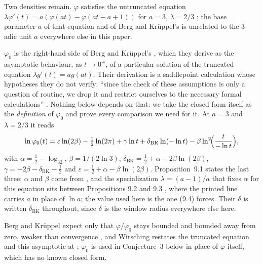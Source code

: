 \documentclass[11pt]{article}
\theoremstyle{definition}
\theoremstyle{remark}
\begin{document}
Two densities remain. $\varphi$ satisfies the
untruncated equation $\lambda\varphi'(t)=a(\varphi(at)-\varphi(at-a+1))$
for $a=3$, $\lambda=2/3$ \cite[eq.~(7.9)]{Wirsching2003}; the base
parameter $a$ of that equation and of Berg and Kr\"uppel's is unrelated
to the $3$-adic unit $a$ everywhere else in this paper.

$\varphi_0$ is the right-hand side of Berg and Kr\"uppel's
\cite[Proposition~9.1, eq.~(9.6)]{BergKruppel1998}, which they derive as
the asymptotic behaviour, as $t\to0^+$, of a particular solution of the
truncated equation $\lambda g'(t)=ag(at)$. Their derivation is a
saddlepoint calculation whose hypotheses they do not verify: ``since the
check of these assumptions is only a question of routine, we drop it and
restrict ourselves to the necessary formal calculations''
\cite[\S9]{BergKruppel1998}. Nothing below depends on that: we take the
closed form itself as the \emph{definition} of $\varphi_0$ and prove
every comparison we need for it. At $a=3$ and $\lambda=2/3$ it reads
\begin{equation}\label{eq:phi0}
 \ln\varphi_0(t)=
 \varepsilon\ln(2\beta)-\tfrac12\ln(2\pi)
 +\gamma\ln t+\delta_{\mathrm{BK}}\ln(-\ln t)
 -\beta\ln^2\!\Bigl(\frac{t}{-\ln t}\Bigr),
\end{equation}
with
$\alpha=\tfrac12-\log_32$,
$\beta=1/(2\ln3)$,
$\delta_{\mathrm{BK}}=\tfrac12+\alpha-2\beta\ln(2\beta)$,
$\gamma=-2\beta-\delta_{\mathrm{BK}}-\tfrac12$ and
$\varepsilon=\tfrac12+\alpha-\beta\ln(2\beta)$. Proposition~9.1 states
the last three; $\alpha$ and $\beta$ come from
\cite[eq.~(9.4)]{BergKruppel1998}, and the specialization
$\lambda=(a-1)/a$ that fixes $\alpha$ for this equation sits between
Propositions 9.2 and 9.3 \cite[p.~180]{BergKruppel1998}, where the
printed line carries $a$ in place of $\ln a$; the value used here is the
one (9.4) forces. Their $\delta$ is written $\delta_{\mathrm{BK}}$
throughout, since $\delta$ is the window radius everywhere else here.

Berg and Kr\"uppel expect only that $\varphi/\varphi_0$ stays bounded and bounded away
from zero, weaker than convergence
\cite[\S9]{BergKruppel1998}, and Wirsching restates the truncated
equation and this asymptotic at
\cite[eq.~(7.10)--(7.11)]{Wirsching2003}; $\varphi_0$ is used in
Conjecture~3 below in place of $\varphi$ itself, which has no known
closed form.
\end{document}
